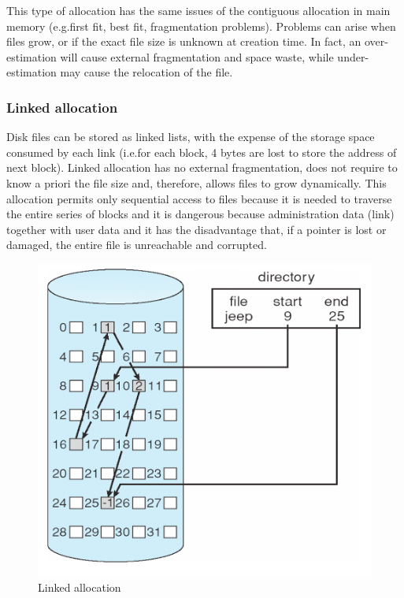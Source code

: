 \documentclass{report}
\begin{document}
This type of allocation has the same issues of the contiguous allocation in main memory (e.g.\@ first fit, best fit, fragmentation problems). Problems can arise when files grow, or if the exact file size is unknown at creation time. In fact, an over-estimation will cause external fragmentation and space waste, while under-estimation may cause the relocation of the file.

\subsubsection{Linked allocation}
Disk files can be stored as linked lists, with the expense of the storage space consumed by each link (i.e.\@ for each block, 4 bytes are lost to store the address of next block). Linked allocation has no external fragmentation, does not require to know a priori the file size and, therefore, allows files to grow dynamically. This allocation permits only sequential access to files because it is needed to traverse the entire series of blocks and it is dangerous because administration data (link) together with user data and it has the disadvantage that, if a pointer is lost or damaged, the entire file is unreachable and corrupted.

\begin{figure}[hbtp]
\centering
\includegraphics[scale=0.35]{images/file_system/linked_allocation.png}
\caption{Linked allocation}
\end{figure}
\end{document}
